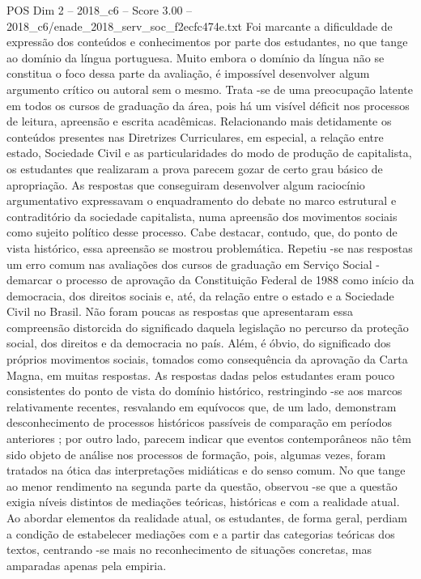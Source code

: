 \begin{textsample}{POS Dim 2 – 2018\_c6 – Score 3.00 – 2018\_c6/enade\_2018\_serv\_soc\_f2ecfc474e.txt}
Foi marcante a dificuldade de expressão dos conteúdos e conhecimentos por parte dos estudantes, no que tange ao domínio da língua portuguesa.
Muito embora o domínio da língua não se constitua o foco dessa parte da avaliação, é impossível desenvolver algum argumento crítico ou autoral sem o mesmo.
Trata -se de uma preocupação latente em todos os cursos de graduação da área, pois há um visível déficit nos processos de leitura, apreensão e escrita acadêmicas.
Relacionando mais detidamente os conteúdos presentes nas Diretrizes Curriculares, em especial, a relação entre estado, Sociedade Civil e as particularidades do modo de produção de capitalista, os estudantes que realizaram a prova parecem gozar de certo grau básico de apropriação.
As respostas que conseguiram desenvolver algum raciocínio argumentativo expressavam o enquadramento do debate no marco estrutural e contraditório da sociedade capitalista, numa apreensão dos movimentos sociais como sujeito político desse processo.
Cabe destacar, contudo, que, do ponto de vista histórico, essa apreensão se mostrou problemática.
Repetiu -se nas respostas um erro comum nas avaliações dos cursos de graduação em Serviço Social - demarcar o processo de aprovação da Constituição Federal de 1988 como início da democracia, dos direitos sociais e, até, da relação entre o estado e a Sociedade Civil no Brasil.
Não foram poucas as respostas que apresentaram essa compreensão distorcida do significado daquela legislação no percurso da proteção social, dos direitos e da democracia no país.
Além, é óbvio, do significado dos próprios movimentos sociais, tomados como consequência da aprovação da Carta Magna, em muitas respostas.
As respostas dadas pelos estudantes eram pouco consistentes do ponto de vista do domínio histórico, restringindo -se aos marcos relativamente recentes, resvalando em equívocos que, de um lado, demonstram desconhecimento de processos históricos passíveis de comparação em períodos anteriores ; por outro lado, parecem indicar que eventos contemporâneos não têm sido objeto de análise nos processos de formação, pois, algumas vezes, foram tratados na ótica das interpretações midiáticas e do senso comum.
No que tange ao menor rendimento na segunda parte da questão, observou -se que a questão exigia níveis distintos de mediações teóricas, históricas e com a realidade atual.
Ao abordar elementos da realidade atual, os estudantes, de forma geral, perdiam a condição de estabelecer mediações com e a partir das categorias teóricas dos textos, centrando -se mais no reconhecimento de situações concretas, mas amparadas apenas pela empiria.

\end{textsample}
